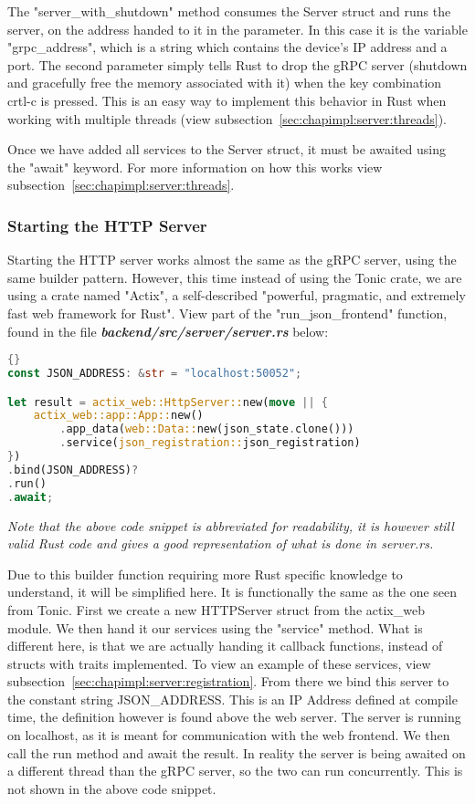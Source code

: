 The "server\_with\_shutdown" method consumes the Server struct and runs the server, on the address handed to it in the parameter. In this case it is the variable "grpc\_address", which is a string which contains the device's IP address and a port. The second parameter simply tells Rust to drop the gRPC server (shutdown and gracefully free the memory associated with it) when the key combination crtl-c is pressed. This is an easy way to implement this behavior in Rust when working with multiple threads (view subsection~\ref{sec:chapimpl:server:threads}).

Once we have added all services to the Server struct, it must be awaited using the "await" keyword. For more information on how this works view subsection~\ref{sec:chapimpl:server:threads}.  

\subsubsection{Starting the HTTP Server}
Starting the HTTP server works almost the same as the gRPC server, using the same builder pattern. However, this time instead of using the Tonic crate, we are using a crate named "Actix", a self-described "powerful, pragmatic, and extremely fast web framework for Rust". View part of the "run\_json\_frontend" function, found in the file \textbf{\textit{backend/src/server/server.rs}} below:
\begin{lstlisting}[language=Rust, style=boxed, showstringspaces=false]{}
const JSON_ADDRESS: &str = "localhost:50052";

let result = actix_web::HttpServer::new(move || {
    actix_web::app::App::new()
        .app_data(web::Data::new(json_state.clone()))
        .service(json_registration::json_registration)
})
.bind(JSON_ADDRESS)?
.run()
.await;
\end{lstlisting}
\textit{Note that the above code snippet is abbreviated for readability, it is however still valid Rust code and gives a good representation of what is done in server.rs.} 

Due to this builder function requiring more Rust specific knowledge to understand, it will be simplified here. It is functionally the same as the one seen from Tonic. First we create a new HTTPServer struct from the actix\_web module. We then hand it our services using the "service" method. What is different here, is that we are actually handing it callback functions, instead of structs with traits implemented. To view an example of these services, view subsection~\ref{sec:chapimpl:server:registration}. From there we bind this server to the constant string JSON\_ADDRESS. This is an IP Address defined at compile time, the definition however is found above the web server. The server is running on localhost, as it is meant for communication with the web frontend. We then call the run method and await the result. In reality the server is being awaited on a different thread than the gRPC server, so the two can run concurrently. This is not shown in the above code snippet. 

